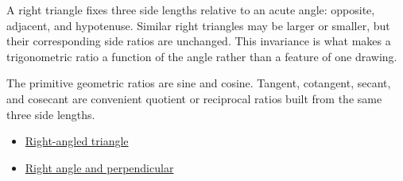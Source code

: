 \begin{remark*}
A right triangle fixes three side lengths relative to an acute angle:
opposite, adjacent, and hypotenuse. Similar right triangles may be larger or
smaller, but their corresponding side ratios are unchanged. This invariance is
what makes a trigonometric ratio a function of the angle rather than a feature
of one drawing.
\end{remark*}



\begin{remark*}
The primitive geometric ratios are sine and cosine. Tangent, cotangent, secant,
and cosecant are convenient quotient or reciprocal ratios built from the same
three side lengths.
\end{remark*}
\begin{dependencies}
\begin{itemize}
  \item \hyperref[def:euclid-triangle-angle-classes]{Right-angled triangle}
  \item \hyperref[def:euclid-right-angle-and-perpendicular]{Right angle and perpendicular}
\end{itemize}
\end{dependencies}
